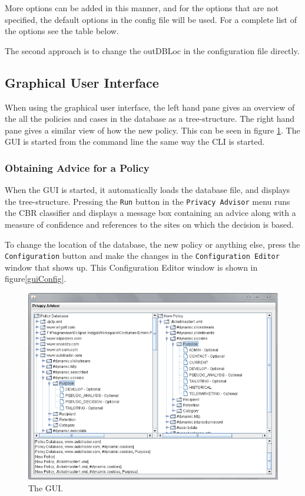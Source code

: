 
More options can be added in this manner, and for the options that are not specified, the default options in the config file will be used. For a complete list of the options see the table below.

The second approach is to change the outDBLoc in the configuration file directly.

\subsection{Graphical User Interface}
When using the graphical user interface, the left hand pane gives an overview of the all the policies and cases in the database as a tree-structure. The right hand pane gives a similar view of how the new policy. This can be seen in figure \ref{guiFigure}. The GUI is started from the command line the same way the CLI is started.

\subsubsection{Obtaining Advice for a Policy}
When the GUI is started, it automatically loads the database file, and displays the tree-structure. Pressing the \texttt{Run} button in the \texttt{Privacy Advisor} menu runs the CBR classifier and displays a message box containing an advice along with a measure of confidence and references to the sites on which the decision is based.


To change the location of the database, the new policy or anything else, press the \texttt{Configuration} button and make the changes in the \texttt{Configuration Editor} window that shows up. This Configuration Editor window is shown in figure\ref{guiConfig}.

 \begin{figure}[h!]
     \includegraphics[width = .6\textwidth]{Documentation/gui.png}
     \caption{The GUI.}
   \label{guiFigure}
 \end{figure}

